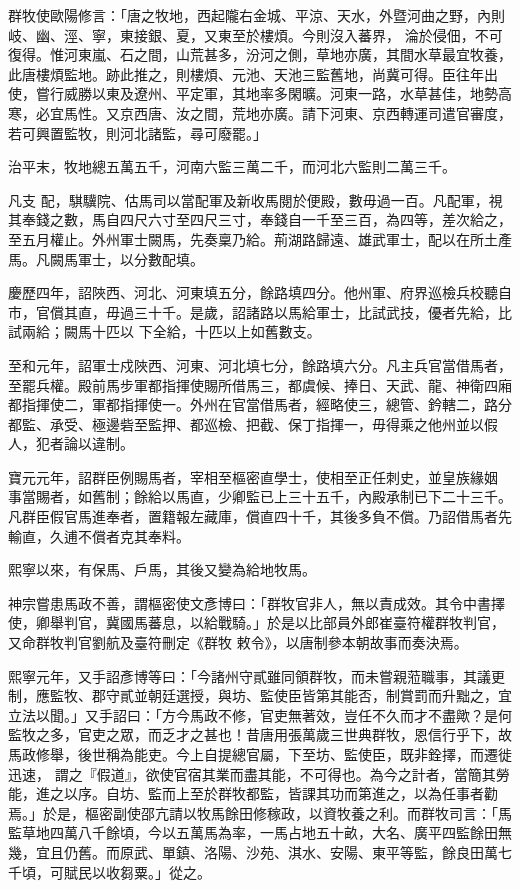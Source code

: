 \begin{pinyinscope}
 群牧使歐陽修言：「唐之牧地，西起隴右金城、平涼、天水，外暨河曲之野，內則岐、幽、涇、寧，東接銀、夏，又東至於樓煩。今則沒入蕃界，
 淪於侵佃，不可復得。惟河東嵐、石之間，山荒甚多，汾河之側，草地亦廣，其間水草最宜牧養，此唐樓煩監地。跡此推之，則樓煩、元池、天池三監舊地，尚冀可得。臣往年出使，嘗行威勝以東及遼州、平定軍，其地率多閑曠。河東一路，水草甚佳，地勢高寒，必宜馬性。又京西唐、汝之間，荒地亦廣。請下河東、京西轉運司遣官審度，若可興置監牧，則河北諸監，尋可廢罷。」



 治平末，牧地總五萬五千，河南六監三萬二千，而河北六監則二萬三千。



 凡支
 配，騏驥院、估馬司以當配軍及新收馬閱於便殿，數毋過一百。凡配軍，視其奉錢之數，馬自四尺六寸至四尺三寸，奉錢自一千至三百，為四等，差次給之，至五月權止。外州軍士闕馬，先奏稟乃給。荊湖路歸遠、雄武軍士，配以在所土產馬。凡闕馬軍士，以分數配填。



 慶歷四年，詔陜西、河北、河東填五分，餘路填四分。他州軍、府界巡檢兵校聽自市，官償其直，毋過三十千。是歲，詔諸路以馬給軍士，比試武技，優者先給，比試兩給；闕馬十匹以
 下全給，十匹以上如舊數支。



 至和元年，詔軍士戍陜西、河東、河北填七分，餘路填六分。凡主兵官當借馬者，至罷兵權。殿前馬步軍都指揮使賜所借馬三，都虞候、捧日、天武、龍、神衛四廂都指揮使二，軍都指揮使一。外州在官當借馬者，經略使三，總管、鈐轄二，路分都監、承受、極邊砦至監押、都巡檢、把截、保丁指揮一，毋得乘之他州並以假人，犯者論以違制。



 寶元元年，詔群臣例賜馬者，宰相至樞密直學士，使相至正任刺史，並皇族緣姻
 事當賜者，如舊制；餘給以馬直，少卿監已上三十五千，內殿承制已下二十三千。凡群臣假官馬進奉者，置籍報左藏庫，償直四十千，其後多負不償。乃詔借馬者先輸直，久逋不償者克其奉料。



 熙寧以來，有保馬、戶馬，其後又變為給地牧馬。



 神宗嘗患馬政不善，謂樞密使文彥博曰：「群牧官非人，無以責成效。其令中書擇使，卿舉判官，冀國馬蕃息，以給戰騎。」於是以比部員外郎崔臺符權群牧判官，又命群牧判官劉航及臺符刪定《群牧
 敕令》，以唐制參本朝故事而奏決焉。



 熙寧元年，又手詔彥博等曰：「今諸州守貳雖同領群牧，而未嘗親蒞職事，其議更制，應監牧、郡守貳並朝廷選授，與坊、監使臣皆第其能否，制賞罰而升黜之，宜立法以聞。」又手詔曰：「方今馬政不修，官吏無著效，豈任不久而才不盡歟？是何監牧之多，官吏之眾，而乏才之甚也！昔唐用張萬歲三世典群牧，恩信行乎下，故馬政修舉，後世稱為能吏。今上自提總官屬，下至坊、監使臣，既非銓擇，而遷徙迅速，
 謂之『假道』，欲使官宿其業而盡其能，不可得也。為今之計者，當簡其勞能，進之以序。自坊、監而上至於群牧都監，皆課其功而第進之，以為任事者勸焉。」於是，樞密副使邵亢請以牧馬餘田修稼政，以資牧養之利。而群牧司言：「馬監草地四萬八千餘頃，今以五萬馬為率，一馬占地五十畝，大名、廣平四監餘田無幾，宜且仍舊。而原武、單鎮、洛陽、沙苑、淇水、安陽、東平等監，餘良田萬七千頃，可賦民以收芻粟。」從之。




\end{pinyinscope}
